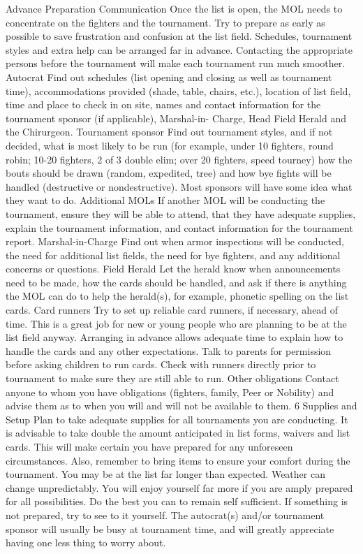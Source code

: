 \documentclass{article}
\begin{document}
Advance Preparation
Communication
Once the list is open, the MOL needs to concentrate on the fighters and the tournament. Try to prepare as
early as possible to save frustration and confusion at the list field. Schedules, tournament styles and extra
help can be arranged far in advance. Contacting the appropriate persons before the tournament will make
each tournament run much smoother.
Autocrat Find out schedules (list opening and closing as well as tournament
time), accommodations provided (shade, table, chairs, etc.), location
of list field, time and place to check in on site, names and contact
information for the tournament sponsor (if applicable), Marshal-in-
Charge, Head Field Herald and the Chirurgeon.
Tournament sponsor Find out tournament styles, and if not decided, what is most likely to
be run (for example, under 10 fighters, round robin; 10-20 fighters, 2
of 3 double elim; over 20 fighters, speed tourney) how the bouts
should be drawn (random, expedited, tree) and how bye fights will
be handled (destructive or nondestructive). Most sponsors will have
some idea what they want to do.
Additional MOLs If another MOL will be conducting the tournament, ensure they will
be able to attend, that they have adequate supplies, explain the
tournament information, and contact information for the tournament
report.
Marshal-in-Charge Find out when armor inspections will be conducted, the need for
additional list fields, the need for bye fighters, and any additional
concerns or questions.
Field Herald Let the herald know when announcements need to be made, how the
cards should be handled, and ask if there is anything the MOL can
do to help the herald(s), for example, phonetic spelling on the list
cards.
Card runners Try to set up reliable card runners, if necessary, ahead of time. This
is a great job for new or young people who are planning to be at the
list field anyway. Arranging in advance allows adequate time to
explain how to handle the cards and any other expectations. Talk to
parents for permission before asking children to run cards. Check
with runners directly prior to tournament to make sure they are still
able to run.
Other obligations Contact anyone to whom you have obligations (fighters, family, Peer
or Nobility) and advise them as to when you will and will not be
available to them.
6
Supplies and Setup
Plan to take adequate supplies for all tournaments you are conducting. It is advisable to take double the
amount anticipated in list forms, waivers and list cards. This will make certain you have prepared for any
unforeseen circumstances.
Also, remember to bring items to ensure your comfort during the tournament. You may be at the list far
longer than expected. Weather can change unpredictably. You will enjoy yourself far more if you are
amply prepared for all possibilities.
Do the best you can to remain self sufficient. If something is not prepared, try to see to it yourself. The
autocrat(s) and/or tournament sponsor will usually be busy at tournament time, and will greatly appreciate
having one less thing to worry about.
\end{document}
